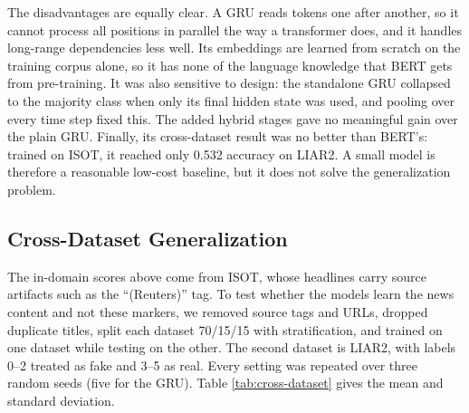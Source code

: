 \documentclass[runningheads]{llncs}
\begin{document}
The disadvantages are equally clear. A GRU reads tokens one after another, so it cannot process all positions in parallel the way a transformer does, and it handles long-range dependencies less well. Its embeddings are learned from scratch on the training corpus alone, so it has none of the language knowledge that BERT gets from pre-training. It was also sensitive to design: the standalone GRU collapsed to the majority class when only its final hidden state was used, and pooling over every time step fixed this. The added hybrid stages gave no meaningful gain over the plain GRU. Finally, its cross-dataset result was no better than BERT's: trained on ISOT, it reached only 0.532 accuracy on LIAR2. A small model is therefore a reasonable low-cost baseline, but it does not solve the generalization problem.

\subsection{Cross-Dataset Generalization}
The in-domain scores above come from ISOT, whose headlines carry source artifacts such as the ``(Reuters)'' tag. To test whether the models learn the news content and not these markers, we removed source tags and URLs, dropped duplicate titles, split each dataset 70/15/15 with stratification, and trained on one dataset while testing on the other. The second dataset is LIAR2, with labels 0--2 treated as fake and 3--5 as real. Every setting was repeated over three random seeds (five for the GRU). Table \ref{tab:cross-dataset} gives the mean and standard deviation.
\end{document}
